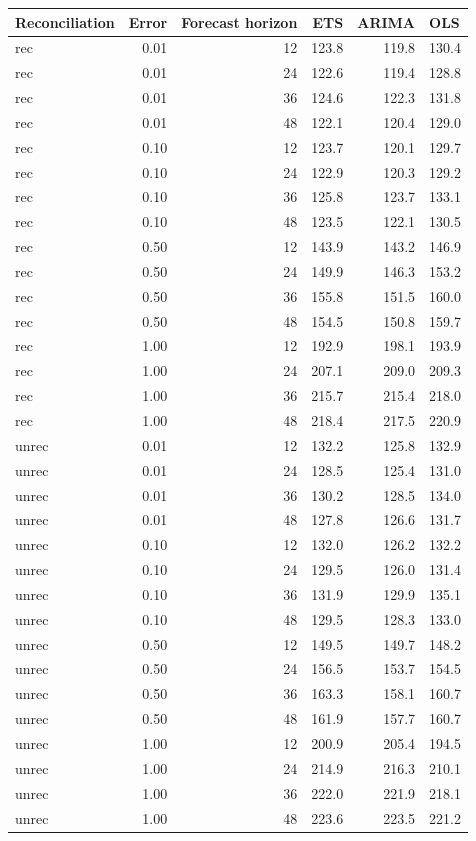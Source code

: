 \documentclass[11pt,a4paper,]{article}
\let\origtable\table
\let\endorigtable\endtable
\renewenvironment{table}[1][2] {
    \expandafter\origtable\expandafter[!htbp]
} {
    \endorigtable
}
\begin{document}
\begin{table}[!h]

\caption{\label{tab:TourismdatasimrollingnoiseFH}Mean RMSE of rolling origin forecasts for simulated data (304 bottom-level series and 8 levels of hierarchy), for different error levels,  methods (ETS, ARIMA, OLS), forecast horizons, with/without reconciliation.}
\centering
\begin{tabular}[t]{lrrrrl}
\toprule
Reconciliation & Error & Forecast horizon & ETS & ARIMA & OLS\\
\midrule
rec & 0.01 & 12 & 123.8 & 119.8 & 130.4\\
rec & 0.01 & 24 & 122.6 & 119.4 & 128.8\\
rec & 0.01 & 36 & 124.6 & 122.3 & 131.8\\
rec & 0.01 & 48 & 122.1 & 120.4 & 129.0\\
rec & 0.10 & 12 & 123.7 & 120.1 & 129.7\\
rec & 0.10 & 24 & 122.9 & 120.3 & 129.2\\
rec & 0.10 & 36 & 125.8 & 123.7 & 133.1\\
rec & 0.10 & 48 & 123.5 & 122.1 & 130.5\\
rec & 0.50 & 12 & 143.9 & 143.2 & 146.9\\
rec & 0.50 & 24 & 149.9 & 146.3 & 153.2\\
rec & 0.50 & 36 & 155.8 & 151.5 & 160.0\\
rec & 0.50 & 48 & 154.5 & 150.8 & 159.7\\
rec & 1.00 & 12 & 192.9 & 198.1 & 193.9\\
rec & 1.00 & 24 & 207.1 & 209.0 & 209.3\\
rec & 1.00 & 36 & 215.7 & 215.4 & 218.0\\
rec & 1.00 & 48 & 218.4 & 217.5 & 220.9\\
unrec & 0.01 & 12 & 132.2 & 125.8 & 132.9\\
unrec & 0.01 & 24 & 128.5 & 125.4 & 131.0\\
unrec & 0.01 & 36 & 130.2 & 128.5 & 134.0\\
unrec & 0.01 & 48 & 127.8 & 126.6 & 131.7\\
unrec & 0.10 & 12 & 132.0 & 126.2 & 132.2\\
unrec & 0.10 & 24 & 129.5 & 126.0 & 131.4\\
unrec & 0.10 & 36 & 131.9 & 129.9 & 135.1\\
unrec & 0.10 & 48 & 129.5 & 128.3 & 133.0\\
unrec & 0.50 & 12 & 149.5 & 149.7 & 148.2\\
unrec & 0.50 & 24 & 156.5 & 153.7 & 154.5\\
unrec & 0.50 & 36 & 163.3 & 158.1 & 160.7\\
unrec & 0.50 & 48 & 161.9 & 157.7 & 160.7\\
unrec & 1.00 & 12 & 200.9 & 205.4 & 194.5\\
unrec & 1.00 & 24 & 214.9 & 216.3 & 210.1\\
unrec & 1.00 & 36 & 222.0 & 221.9 & 218.1\\
unrec & 1.00 & 48 & 223.6 & 223.5 & 221.2\\
\bottomrule
\end{tabular}
\end{table}
\end{document}
